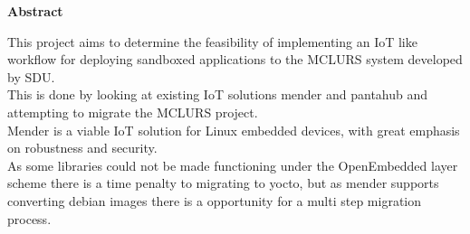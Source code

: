 \documentclass[../../main.tex]{subfiles}
\begin{document}
\begin{center}
	\bf\large Abstract
\end{center}

This project aims to determine the feasibility of implementing an IoT like workflow for deploying
sandboxed applications to the MCLURS system developed by SDU.\\
This is done by looking at existing IoT solutions mender and pantahub and attempting to migrate
the MCLURS project.\\
Mender is a viable IoT solution for Linux embedded devices, with great emphasis on robustness
and security.\\
As some libraries could not be made functioning under the OpenEmbedded layer scheme
there  is a time penalty to migrating to yocto, but as mender supports converting debian images
there is a opportunity for a multi step migration process.






	
\end{document}
